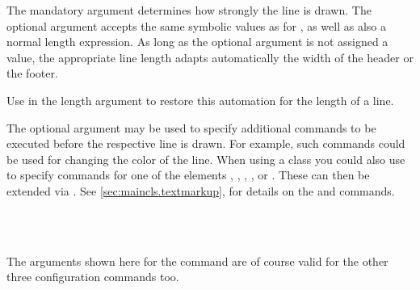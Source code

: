 The mandatory argument  determines how strongly the
line is drawn. The optional argument  accepts the same
symbolic values as  for , as well as
also a normal length expression.  As long as the optional argument
 is not assigned a value, the appropriate line length
adapts automatically the width of the header or the footer.

Use  in the length argument to restore this automation
for the length of a line.

%
%
%
%
%
The optional argument  may
be used to specify additional commands to be executed before the respective
line is drawn.  For example, such commands could be used for changing the
color%
%
 of the line.  When using a
{\KOMAScript} class you could also use
 to specify commands for one of the
elements , ,
, , or
.  These can then be extended via
.  See
\autoref{sec:maincls.textmarkup}, 
for details on the  and  commands.
%
%
%
%
%


\begin{Declaration}
                         \\
                         \Parameter{}\\
                         \Parameter{}\OParameter{}
\end{Declaration}%
The arguments shown here for the command  are of
course valid for the other three configuration commands too.

